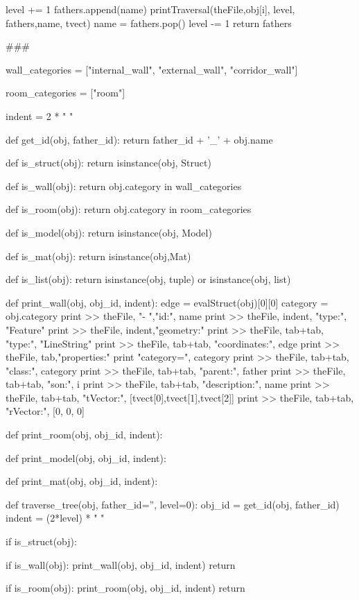 \documentclass[11pt,oneside]{article}    %
\begin{document}
{         level += 1
         fathers.append(name)
         printTraversal(theFile,obj[i], level, fathers,name, tvect)
         name = fathers.pop()
         level -= 1
   return fathers



###

wall_categories = ["internal_wall", "external_wall", "corridor_wall"]

room_categories = ["room"]

indent = 2 * " "

def get_id(obj, father_id):
	return father_id + '_' + obj.name

def is_struct(obj):
	return isinstance(obj, Struct)
   
def is_wall(obj):
	return obj.category in wall_categories

def is_room(obj):
	return obj.category in room_categories

def is_model(obj):
	return isinstance(obj, Model)

def is_mat(obj):
	return isinstance(obj,Mat)

def is_list(obj):
	return isinstance(obj, tuple) or isinstance(obj, list)

def print_wall(obj, obj_id, indent):
	edge = evalStruct(obj)[0][0]
	category = obj.category
    print >> theFile, "-   ","id:", name
    print >> theFile, indent, "type:", "Feature"
    print >> theFile, indent,"geometry:" 
    print >> theFile, tab+tab, "type:", "LineString"
    print >> theFile, tab+tab, "coordinates:", edge
    print >> theFile, tab,"properties:"
    print "category=", category
    print >> theFile, tab+tab, "class:", category
    print >> theFile, tab+tab, "parent:", father
    print >> theFile, tab+tab, "son:", i
    print >> theFile, tab+tab, "description:", name
    print >> theFile, tab+tab, "tVector:", [tvect[0],tvect[1],tvect[2]]
    print >> theFile, tab+tab, "rVector:", [0, 0, 0]

	

def print_room(obj, obj_id, indent):
	

def print_model(obj, obj_id, indent):
	

def print_mat(obj, obj_id, indent):


def traverse_tree(obj, father_id='', level=0): 
	obj_id = get_id(obj, father_id)
	indent = (2*level) * " "
	
	if is_struct(obj):

		if is_wall(obj):
			print_wall(obj, obj_id, indent)
			return

		if is_room(obj):
			print_room(obj, obj_id, indent)
			return

}
\end{document}
